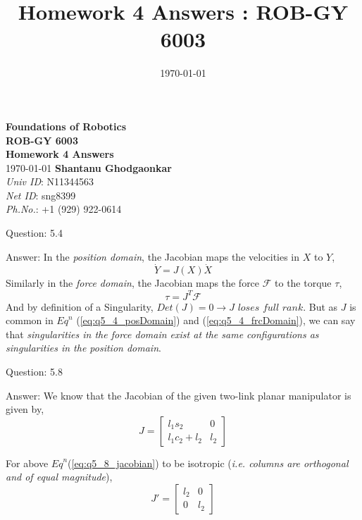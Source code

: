 \documentclass[a4paper]{article}
\title{Homework 4 Answers : ROB-GY 6003}
\author{\myName}
\date{\today}
\newcommand{\myName}{\textbf{Shantanu Ghodgaonkar}\\\textit{Univ ID}: N11344563\\\textit{Net ID}: sng8399\\\textit{Ph.No.}: +1 (929) 922-0614}
\begin{document}
	
	\begin{titlepage}
	    \centering
	    \vspace{2cm}
	    \Huge\textbf{Foundations of Robotics \\ ROB-GY 6003 \\ Homework 4 Answers}
	    \vspace{1cm}
	    \\ \Large \today
	    \vfill 
	    \Large \myName
	\end{titlepage}
	
	\begin{qalist}			
		\item[Question: 5.4] \setcounter{equation}{0} %
		\item[Answer:] In the \emph{position domain}, the Jacobian maps the velocities in $X$ to $Y$, 
			\begin{equation} \label{eq:q5_4_posDomain}\dot{Y} = J(X) \dot{X} \end{equation}
			Similarly in the \emph{force domain}, the Jacobian maps the force $\mathcal{F}$ to the torque $\tau$, 
			\begin{equation}\label{eq:q5_4_frcDomain} \tau = {J}^{T} \mathcal{F}\end{equation}
			And by definition of a Singularity, $Det(J) = 0 \rightarrow J \textit{ loses full rank}$. But as $J$ is common in ${Eq}^{n}$ (\ref{eq:q5_4_posDomain}) and (\ref{eq:q5_4_frcDomain}), we can say that \emph{singularities in the force domain exist at the same configurations as
singularities in the position domain}.
			
		\item[Question: 5.8] \setcounter{equation}{0} %
		\item[Answer:] We know that the Jacobian of the given two-link planar manipulator is given by, 
			\begin{equation}\label{eq:q5_8_jacobian}
				J = \begin{bmatrix}{l}_{1}{s}_{2} & 0 \\ {l}_{1}{c}_{2}+{l}_{2} & {l}_{2}\end{bmatrix}
			\end{equation}
			
			For above ${Eq}^{n}$(\ref{eq:q5_8_jacobian}) to be isotropic (\emph{i.e. columns are orthogonal and of equal magnitude}), 
			\begin{equation}\label{eq:q5_8_jacobianIso}
				J' = \begin{bmatrix}{l}_{2} & 0 \\ 0 & {l}_{2}\end{bmatrix}
			\end{equation}
			

\end{qalist}
\end{document}
